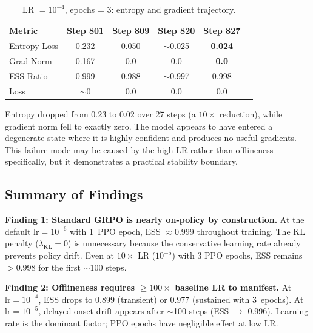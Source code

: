 \documentclass[11pt,a4paper]{article}
\begin{document}
\begin{table}[H]
\centering
\caption{LR $= 10^{-4}$, epochs = 3: entropy and gradient trajectory.}
\label{tab:lr1e4_ep3_entropy}
\begin{tabular}{@{}lccccc@{}}
\toprule
\textbf{Metric} & \textbf{Step 801} & \textbf{Step 809} & \textbf{Step 820} & \textbf{Step 827} \\
\midrule
Entropy Loss   & 0.232 & 0.050 & $\sim$0.025 & \textbf{0.024} \\
Grad Norm      & 0.167 & 0.0   & 0.0         & \textbf{0.0}   \\
ESS Ratio      & 0.999 & 0.988 & $\sim$0.997 & 0.998 \\
Loss           & $\sim$0 & 0.0  & 0.0         & 0.0   \\
\bottomrule
\end{tabular}
\end{table}

Entropy dropped from 0.23 to 0.02 over 27 steps (a $10\times$ reduction), while
gradient norm fell to exactly zero. The model appears to have entered a
degenerate state where it is highly confident and produces no useful gradients.
This failure mode may be caused by the high LR rather than offlineness
specifically, but it demonstrates a practical stability boundary.

\subsection{Summary of Findings}

\begin{keyinsight}
\textbf{Finding 1: Standard GRPO is nearly on-policy by construction.}
At the default $\mathrm{lr} = 10^{-6}$ with 1~PPO epoch, ESS $\approx 0.999$
throughout training. The KL penalty ($\lambda_{\mathrm{KL}} = 0$) is unnecessary
because the conservative learning rate already prevents policy drift. Even at
$10\times$ LR ($10^{-5}$) with 3 PPO epochs, ESS remains $>0.998$ for the first
$\sim$100 steps.
\end{keyinsight}

\begin{keyinsight}
\textbf{Finding 2: Offlineness requires $\geq\!100\times$ baseline LR to manifest.}
At $\mathrm{lr} = 10^{-4}$, ESS drops to 0.899 (transient) or 0.977 (sustained
with 3~epochs). At $\mathrm{lr} = 10^{-5}$, delayed-onset drift appears after
$\sim$100 steps (ESS $\to$ 0.996). Learning rate is the dominant factor; PPO
epochs have negligible effect at low LR.
\end{keyinsight}
\end{document}
